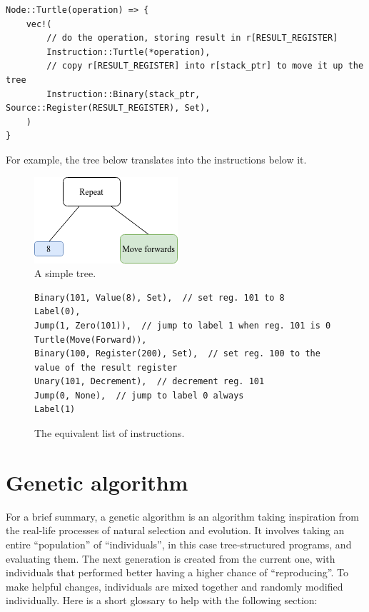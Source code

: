\documentclass{report}
\begin{document}
\begin{verbatim}
Node::Turtle(operation) => {
    vec!(
        // do the operation, storing result in r[RESULT_REGISTER]
        Instruction::Turtle(*operation),
        // copy r[RESULT_REGISTER] into r[stack_ptr] to move it up the tree
        Instruction::Binary(stack_ptr, Source::Register(RESULT_REGISTER), Set),
    )
}
\end{verbatim}

For example, the tree below translates into the instructions below it.

\begin{figure}[H]
    \centering
    \includegraphics{tree_3}
    \caption{A simple tree.}
\end{figure}

\begin{figure}[H]
\begin{verbatim}
Binary(101, Value(8), Set),  // set reg. 101 to 8
Label(0),
Jump(1, Zero(101)),  // jump to label 1 when reg. 101 is 0
Turtle(Move(Forward)),
Binary(100, Register(200), Set),  // set reg. 100 to the value of the result register
Unary(101, Decrement),  // decrement reg. 101
Jump(0, None),  // jump to label 0 always
Label(1)
\end{verbatim}
\caption{The equivalent list of instructions.}
\end{figure}

\section{Genetic algorithm}

For a brief summary, a genetic algorithm is an algorithm taking inspiration from the real-life processes of natural selection and evolution. It involves taking an entire ``population'' of ``individuals'', in this case tree-structured programs, and evaluating them. The next generation is created from the current one, with individuals that performed better having a higher chance of ``reproducing''. To make helpful changes, individuals are mixed together and randomly modified individually. Here is a short glossary to help with the following section:
\end{document}

